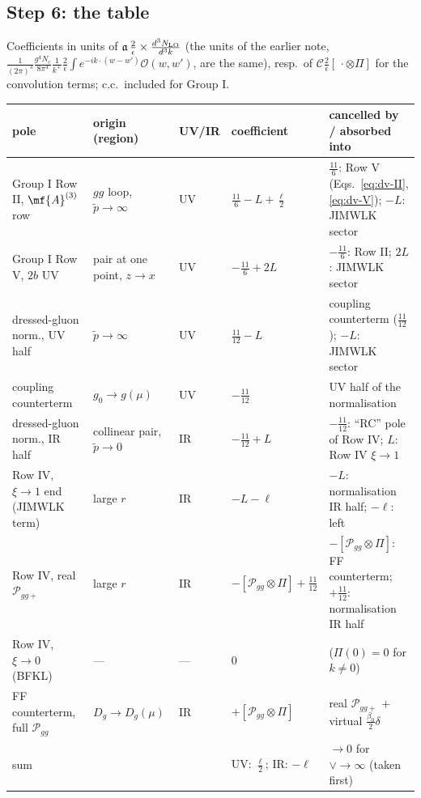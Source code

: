 {\subsection*{Step 6: the table}
\noindent Coefficients in units of $\mathfrak{a}\,\frac{2}{\epsilon}\times\frac{d^{3}N_{\rm LO}}{d^{3}k}$ (the units of the earlier note, $\frac{1}{(2\pi)^{3}}\frac{g^{4}N_{c}}{8\pi^{4}}\frac{1}{k^{+}}\frac{2}{\epsilon}\int e^{-ik\cdot(w-w')}\mathcal{O}(w,w')$, are the same), resp.\ of $\mathcal{C}\frac{2}{\epsilon}[\,\cdot\otimes\Pi]$ for the convolution terms; c.c.\ included for Group I.
\begin{center}
\renewcommand{\arraystretch}{1.3}\small
\begin{tabular}{|p{4.3cm}|p{3.6cm}|p{0.9cm}|p{2.9cm}|p{5.4cm}|}\hline
pole & origin (region) & UV/IR & coefficient & cancelled by / absorbed into\\\hline
Group I Row II, $\mf{A}^{(3)}$ row & $gg$ loop, $\tilde p\to\infty$ & UV & $\frac{11}{6}-L+\frac{\ell}{2}$ & $\frac{11}{6}$: Row V (Eqs.~\eqref{eq:dv-II}, \eqref{eq:dv-V}); $-L$: JIMWLK sector\\
Group I Row V, $2b$ UV & pair at one point, $z\to x$ & UV & $-\frac{11}{6}+2L$ & $-\frac{11}{6}$: Row II; $2L$: JIMWLK sector\\
dressed-gluon norm., UV half & $\tilde p\to\infty$ & UV & $\frac{11}{12}-L$ & coupling counterterm ($\frac{11}{12}$); $-L$: JIMWLK sector\\
coupling counterterm & $g_{0}\to g(\mu)$ & UV & $-\frac{11}{12}$ & UV half of the normalisation\\\hline
dressed-gluon norm., IR half & collinear pair, $\tilde p\to0$ & IR & $-\frac{11}{12}+L$ & $-\frac{11}{12}$: ``RC'' pole of Row IV; $L$: Row IV $\xi\to1$\\
Row IV, $\xi\to1$ end (JIMWLK term) & large $r$ & IR & $-L-\ell$ & $-L$: normalisation IR half; $-\ell$: left\\
Row IV, real $\mathcal{P}_{gg+}$ & large $r$ & IR & $-[\mathcal{P}_{gg}\otimes\Pi]+\frac{11}{12}$ & $-[\mathcal{P}_{gg}\otimes\Pi]$: FF counterterm; $+\frac{11}{12}$: normalisation IR half\\
Row IV, $\xi\to0$ (BFKL) & --- & --- & $0$ & ($\Pi(0)=0$ for $k\neq0$)\\
FF counterterm, full $\mathcal{P}_{gg}$ & $D_{g}\to D_{g}(\mu)$ & IR & $+[\mathcal{P}_{gg}\otimes\Pi]$ & real $\mathcal{P}_{gg+}$ $+$ virtual $\frac{\beta_{0}}{2}\delta$\\\hline
sum & & & UV: $\frac{\ell}{2}$; IR: $-\ell$ & $\to0$ for $\vee\to\infty$ (taken first)\\\hline

\end{tabular}
\end{center}}
